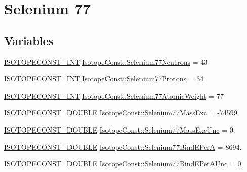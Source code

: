 \hypertarget{group___isotope_const-_selenium-_se77}{}\section{Selenium 77}
\label{group___isotope_const-_selenium-_se77}
\subsection*{Variables}
\begin{DoxyCompactItemize}
\item 
\mbox{\hyperlink{group___isotope_const-_macros_ga5f18360b3e99483a35c32d789e62621c}{I\+S\+O\+T\+O\+P\+E\+C\+O\+N\+S\+T\+\_\+\+I\+NT}} \mbox{\hyperlink{group___isotope_const-_selenium-_se77_ga67169e36cdd1ae93a0e13e32b9b8ad3d}{Isotope\+Const\+::\+Selenium77\+Neutrons}} = 43
\item 
\mbox{\hyperlink{group___isotope_const-_macros_ga5f18360b3e99483a35c32d789e62621c}{I\+S\+O\+T\+O\+P\+E\+C\+O\+N\+S\+T\+\_\+\+I\+NT}} \mbox{\hyperlink{group___isotope_const-_selenium-_se77_gabfe2b0dfb2ccd274d9dd25f44ae7a127}{Isotope\+Const\+::\+Selenium77\+Protons}} = 34
\item 
\mbox{\hyperlink{group___isotope_const-_macros_ga5f18360b3e99483a35c32d789e62621c}{I\+S\+O\+T\+O\+P\+E\+C\+O\+N\+S\+T\+\_\+\+I\+NT}} \mbox{\hyperlink{group___isotope_const-_selenium-_se77_gadb6cd2a71f7262e6239540dad0996fae}{Isotope\+Const\+::\+Selenium77\+Atomic\+Weight}} = 77
\item 
\mbox{\hyperlink{group___isotope_const-_macros_ga8f45a7272ce02c0b4c65c44636ed719a}{I\+S\+O\+T\+O\+P\+E\+C\+O\+N\+S\+T\+\_\+\+D\+O\+U\+B\+LE}} \mbox{\hyperlink{group___isotope_const-_selenium-_se77_ga4081e9c2187856b0510f08ff90139c06}{Isotope\+Const\+::\+Selenium77\+Mass\+Exc}} = -\/74599.
\item 
\mbox{\hyperlink{group___isotope_const-_macros_ga8f45a7272ce02c0b4c65c44636ed719a}{I\+S\+O\+T\+O\+P\+E\+C\+O\+N\+S\+T\+\_\+\+D\+O\+U\+B\+LE}} \mbox{\hyperlink{group___isotope_const-_selenium-_se77_ga51264962c6071117dae635bc2b4a3f86}{Isotope\+Const\+::\+Selenium77\+Mass\+Exc\+Unc}} = 0.
\item 
\mbox{\hyperlink{group___isotope_const-_macros_ga8f45a7272ce02c0b4c65c44636ed719a}{I\+S\+O\+T\+O\+P\+E\+C\+O\+N\+S\+T\+\_\+\+D\+O\+U\+B\+LE}} \mbox{\hyperlink{group___isotope_const-_selenium-_se77_ga6489c2bdf26ff108af2b28082fa04d2c}{Isotope\+Const\+::\+Selenium77\+Bind\+E\+PerA}} = 8694.
\item 
\mbox{\hyperlink{group___isotope_const-_macros_ga8f45a7272ce02c0b4c65c44636ed719a}{I\+S\+O\+T\+O\+P\+E\+C\+O\+N\+S\+T\+\_\+\+D\+O\+U\+B\+LE}} \mbox{\hyperlink{group___isotope_const-_selenium-_se77_ga7c1501771c4a3e979cec329e4b481ef2}{Isotope\+Const\+::\+Selenium77\+Bind\+E\+Per\+A\+Unc}} = 0.

\end{DoxyCompactItemize}
